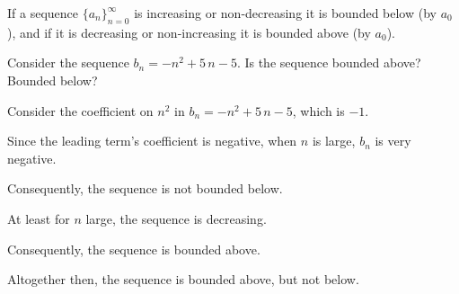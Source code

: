 \documentclass{ximera}
\newcommand{\ds}{\displaystyle}
\begin{document}
If a sequence $\ds
\{a_n\}_{n=0}^\infty$ is increasing or non-decreasing it is bounded
below (by $\ds a_0$), and if it is decreasing or non-increasing it is
bounded above (by $\ds a_0$).

\begin{question}
  Consider the sequence \(b_{n} = -n^{2} + 5 \, n - 5\).  Is the sequence bounded above?  Bounded below?
  \begin{solution}
    \begin{hint}
      Consider the coefficient on \(n^{2}\) in \(b_{n} = -n^{2} + 5 \, n - 5\), which is \(-1\).
    \end{hint}
    \begin{hint}
      Since the leading term's coefficient is negative, when \(n\) is large, \(b_{n}\) is very negative.
    \end{hint}
    \begin{hint}
      Consequently, the sequence is not bounded below.
    \end{hint}
    \begin{hint}
      At least for \(n\) large, the sequence is decreasing.
    \end{hint}
    \begin{hint}
      Consequently, the sequence is bounded above.
    \end{hint}
    \begin{hint}
      Altogether then, the sequence is bounded above, but not below.
    \end{hint}

    \begin{multiple-choice}
    \end{multiple-choice}

  \end{solution}
\end{question}
            
\end{document}
